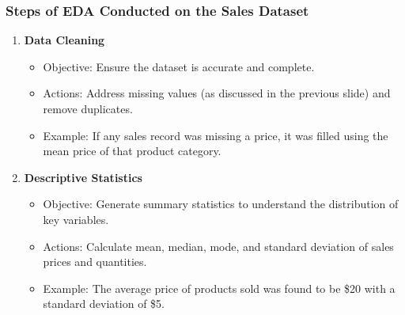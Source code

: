 \documentclass{beamer}
\begin{document}
\begin{frame}[fragile]
    \frametitle{Steps of EDA Conducted on the Sales Dataset}
    \begin{enumerate}
        \item \textbf{Data Cleaning} 
            \begin{itemize}
                \item Objective: Ensure the dataset is accurate and complete.
                \item Actions: Address missing values (as discussed in the previous slide) and remove duplicates.
                \item Example: If any sales record was missing a price, it was filled using the mean price of that product category.
            \end{itemize}
        
        \item \textbf{Descriptive Statistics} 
            \begin{itemize}
                \item Objective: Generate summary statistics to understand the distribution of key variables.
                \item Actions: Calculate mean, median, mode, and standard deviation of sales prices and quantities.
                \item Example: The average price of products sold was found to be \$20 with a standard deviation of \$5.
            \end{itemize}
    \end{enumerate}
\end{frame}
\end{document}
